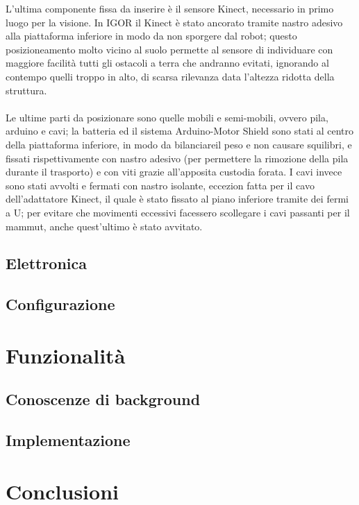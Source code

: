 \documentclass[Lau]{sapthesis}
\begin{document}
L'ultima componente fissa da inserire è il sensore Kinect, necessario in primo luogo per la visione. In \textcolor{sapred}{IGOR} il Kinect è stato ancorato tramite nastro adesivo alla piattaforma inferiore in modo da non sporgere dal robot; questo posizioneamento molto vicino al suolo permette al sensore di individuare con maggiore facilità tutti gli ostacoli a terra che andranno evitati, ignorando al contempo quelli troppo in alto, di scarsa rilevanza data l'altezza ridotta della struttura.\\\\
Le ultime parti da posizionare sono quelle mobili e semi-mobili, ovvero pila, arduino e cavi; la batteria ed il sistema Arduino-Motor Shield sono stati al centro della piattaforma inferiore, in modo da bilanciareil peso e non causare squilibri, e fissati rispettivamente con nastro adesivo (per permettere la rimozione della pila durante il trasporto) e con viti grazie all'apposita custodia forata. I cavi invece sono stati avvolti e fermati con nastro isolante, eccezion fatta per il cavo dell'adattatore Kinect, il quale è stato fissato al piano inferiore tramite dei fermi a U; per evitare che movimenti eccessivi facessero scollegare i cavi passanti per il mammut, anche quest'ultimo è stato avvitato.
\section{Elettronica}
\section{Configurazione}
\chapter{Funzionalità}
\section{Conoscenze di background}
\section{Implementazione}

\chapter{Conclusioni}
\end{document}

